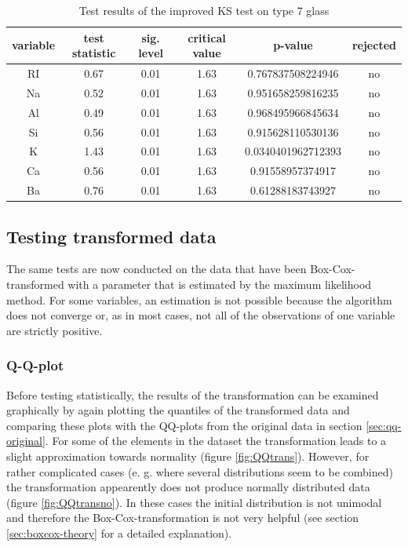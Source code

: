 \documentclass[a4paper, 12pt, titlepage, headsepline, listof = totoc, bibliography = totoc, numbers = noenddot]{scrartcl}
\begin{document}
\begin{table}[h!]
\centering
\begin{tabular}{|cccccc|} \hline variable & test statistic & sig. level & critical value & p-value & rejected\\ \hline RI & 0.67 & 0.01 & 1.63 & 0.767837508224946 & no\\ 
Na & 0.52 & 0.01 & 1.63 & 0.951658259816235 & no\\ 
Al & 0.49 & 0.01 & 1.63 & 0.968495966845634 & no\\ 
Si & 0.56 & 0.01 & 1.63 & 0.915628110530136 & no\\ 
K & 1.43 & 0.01 & 1.63 & 0.0340401962712393 & no\\ 
Ca & 0.56 & 0.01 & 1.63 & 0.91558957374917 & no\\ 
Ba & 0.76 & 0.01 & 1.63 & 0.61288183743927 & no\\ \hline \end{tabular}\caption{Test results of the improved KS test on type 7 glass}
\label{tab:KS-type7}
\end{table}

\subsection{Testing transformed data}\label{sec:testing-transformed-data}

The same tests are now conducted on the data that have been Box-Cox-transformed with a parameter that is estimated by the maximum likelihood method. For some variables, an estimation is not possible because the algorithm does not converge or, as in most cases, not all of the observations of one variable are strictly positive.
\subsubsection{Q-Q-plot}\label{sec:qq-transformed}

Before testing statistically, the results of the transformation can be examined graphically by again plotting the quantiles of the transformed data and comparing these plots with the QQ-plots from the original data in section \ref{sec:qq-original}. For some of the elements in the dataset the transformation leads to a slight approximation towards normality (figure \ref{fig:QQtrans}). However, for rather complicated cases (e. g. where several distributions seem to be combined) the transformation appearently does not produce normally distributed data (figure \ref{fig:QQtransno}). In these cases the initial distribution is not unimodal and therefore the Box-Cox-transformation is not very helpful (see section \ref{sec:boxcox-theory} for a detailed explanation).
\end{document}
